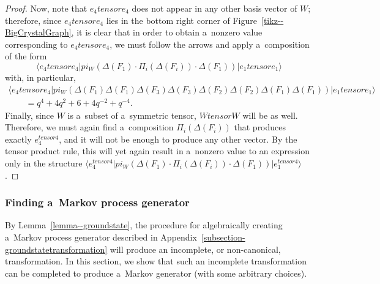 \documentclass[10pt,a4paper]{amsart}
\numberwithin{equation}{section}
\theoremstyle{definition}
\def\pi{pi}
\def\otimes{ tensor }
\begin{document}
\begin{proof}[Proof]
Now, note that $e_4 \otimes e_4$ does not appear in any other basis vector of $W$; therefore, since $e_4 \otimes e_4$ lies in the bottom right corner of Figure~\ref{tikz--BigCrystalGraph}, it is clear that in order to obtain a~nonzero value corresponding to $e_4 \otimes e_4$, we must follow the arrows and apply a~composition of the form
\[\langle e_4 \otimes e_4| \pi_W(\Delta(F_1) \cdot \Pi_i (\Delta(F_i)) \cdot \Delta(F_1))| e_1 \otimes e_1 \rangle\]
with, in particular,
\begin{gather*}
\langle e_4 \otimes e_4| \pi_W(\Delta(F_1)\Delta(F_1)\Delta(F_3)\Delta(F_3)\Delta(F_2)\Delta(F_2)\Delta(F_1) \Delta(F_1))| e_1 \otimes e_1 \rangle\\
\qquad = q^4 + 4q^2 + 6 + 4q^{-2} + q^{-4}.
\end{gather*}
Finally, since $W$ is a~subset of a~symmetric tensor, $W \otimes W$ will be as well. Therefore, we must again find a~composition $\Pi_i(\Delta (F_i))$ that produces exactly $e_4^{\otimes 4}$, and it will not be enough to produce any other vector. By the tensor product rule, this will yet again result in a~nonzero value to an expression only in the structure $
\big\langle e_4^{\otimes 4}| \pi_W(\Delta(F_1) \cdot \Pi_i (\Delta(F_i)) \cdot \Delta(F_1))| e_1^{\otimes 4}\big\rangle$.
\end{proof}

\subsubsection{Finding a~Markov process generator} \label{section--FindingAlgebraGenerator}

By Lemma~\ref{lemma--groundstate}, the procedure for algebraically creating a~Markov process generator described in Appendix~\ref{subsection-groundstatetransformation} will produce an incomplete, or non-canonical, transformation. In this section, we show that such an incomplete transformation can be completed to produce a~Markov generator (with some arbitrary choices).
\end{document}
